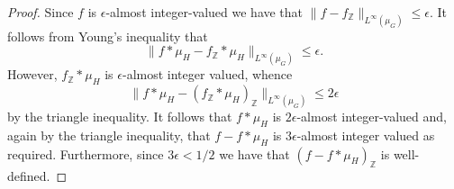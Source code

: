 \documentclass[12pt]{amsart}
\numberwithin{equation}{section}
\theoremstyle{plain}
\theoremstyle{definition}
\renewcommand{\leq}{\leqslant}
\newcommand{\Z}{\mathbb{Z}}
\begin{document}
\begin{proof}
Since $f$ is $\epsilon$-almost integer-valued we have that $\|f-f_\Z\|_{L^\infty(\mu_G)} \leq \epsilon$.  It follows from Young's inequality that
\begin{equation}\label{eqn.wb}
\|f \ast \mu_H - f_\Z \ast \mu_H\|_{L^\infty(\mu_G)} \leq \epsilon.
\end{equation}
However, $f_\Z\ast \mu_H$ is $\epsilon$-almost integer valued, whence
\begin{equation*}
\|f \ast \mu_H - (f_\Z \ast \mu_H)_\Z\|_{L^\infty(\mu_G)} \leq 2\epsilon
\end{equation*}
by the triangle inequality.  It follows that $f \ast \mu_H$ is $2\epsilon$-almost integer-valued and, again by the triangle inequality, that $f-f \ast \mu_H$ is $3\epsilon$-almost integer valued as required. Furthermore, since $3\epsilon<1/2$ we have that $(f-f \ast \mu_H)_\Z$ is well-defined.


\end{proof}
\end{document}
